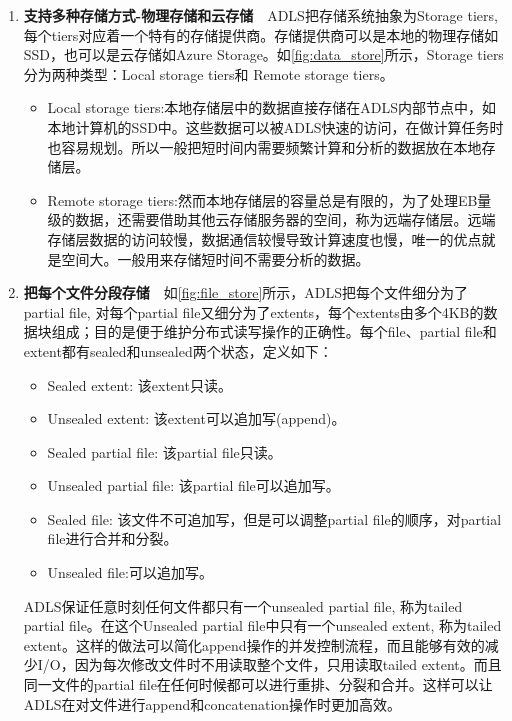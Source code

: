 \begin{enumerate}
	\item \textbf{支持多种存储方式-物理存储和云存储}\ \ ADLS把存储系统抽象为Storage tiers, 每个tiers对应着一个特有的存储提供商。存储提供商可以是本地的物理存储如SSD，也可以是云存储如Azure Storage。如\ref{fig:data_store}所示，Storage tiers分为两种类型：Local storage tiers和 Remote storage tiers。
	\begin{itemize}
		\item Local storage tiers:本地存储层中的数据直接存储在ADLS内部节点中，如本地计算机的SSD中。这些数据可以被ADLS快速的访问，在做计算任务时也容易规划。所以一般把短时间内需要频繁计算和分析的数据放在本地存储层。
		\item Remote storage tiers:然而本地存储层的容量总是有限的，为了处理EB量级的数据，还需要借助其他云存储服务器的空间，称为远端存储层。远端存储层数据的访问较慢，数据通信较慢导致计算速度也慢，唯一的优点就是空间大。一般用来存储短时间不需要分析的数据。
	\end{itemize}
	\item \textbf{把每个文件分段存储}\ \ 如\ref{fig:file_store}所示，ADLS把每个文件细分为了partial file, 对每个partial file又细分为了extents，每个extents由多个4KB的数据块组成；目的是便于维护分布式读写操作的正确性。每个file、partial file和extent都有sealed和unsealed两个状态，定义如下：
	\begin{itemize}
		\item Sealed extent: 该extent只读。
		\item Unsealed extent: 该extent可以追加写(append)。
		\item Sealed partial file: 该partial file只读。
		\item Unsealed partial file: 该partial file可以追加写。
		\item Sealed file: 该文件不可追加写，但是可以调整partial file的顺序，对partial file进行合并和分裂。
		\item Unsealed file:可以追加写。
	\end{itemize}
	ADLS保证任意时刻任何文件都只有一个unsealed partial file, 称为tailed partial file。在这个Unsealed partial file中只有一个unsealed extent, 称为tailed extent。这样的做法可以简化append操作的并发控制流程，而且能够有效的减少I/O，因为每次修改文件时不用读取整个文件，只用读取tailed extent。而且同一文件的partial file在任何时候都可以进行重排、分裂和合并。这样可以让ADLS在对文件进行append和concatenation操作时更加高效。
\end{enumerate}

